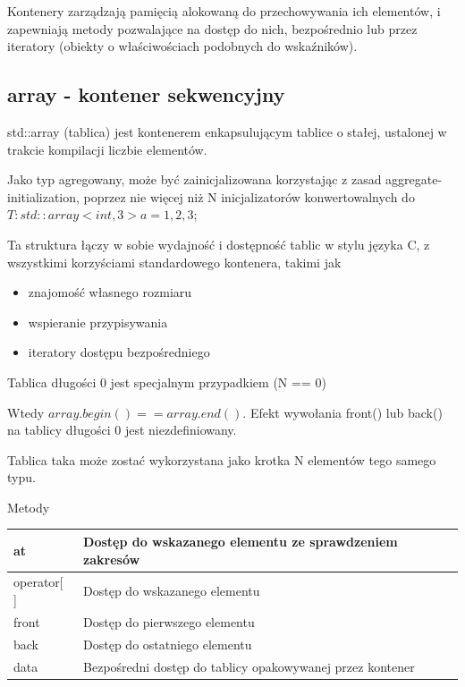 \documentclass[12pt]{article}
\begin{document}
    Kontenery zarządzają pamięcią alokowaną do przechowywania ich elementów, i zapewniają metody pozwalające na dostęp do nich, bezpośrednio lub przez iteratory (obiekty o właściwościach podobnych do wskaźników).

    \subsection{array - kontener sekwencyjny}
    std::array (tablica) jest kontenerem enkapsulującym tablice o stałej, ustalonej w trakcie kompilacji liczbie elementów.

    Jako typ agregowany, może być zainicjalizowana korzystając z zasad aggregate-initialization, poprzez nie więcej niż N inicjalizatorów konwertowalnych do \\ $T: std::array<int, 3> a = {1,2,3};$

    Ta struktura łączy w sobie wydajność i dostępność tablic w stylu języka C, z wszystkimi korzyściami standardowego kontenera, takimi jak
    \begin{itemize}
        \item znajomość własnego rozmiaru
        \item wspieranie przypisywania
        \item iteratory dostępu bezpośredniego
    \end{itemize}

    Tablica długości 0 jest specjalnym przypadkiem (N == 0)

    Wtedy $array.begin() == array.end()$. Efekt wywołania front() lub back() na tablicy długości 0 jest niezdefiniowany.

    Tablica taka może zostać wykorzystana jako krotka N elementów tego samego typu.

    Metody

    \begin{table}[H]
        \begin{tabular}{|l|l|}
            \hline
            at & Dostęp do wskazanego elementu ze sprawdzeniem zakresów    \\ \hline
            operator[ ] & Dostęp do wskazanego elementu                             \\ \hline
            front & Dostęp do pierwszego elementu                             \\ \hline
            back & Dostęp do ostatniego elementu                             \\ \hline
            data & Bezpośredni dostęp do tablicy opakowywanej przez kontener \\ \hline
        \end{tabular}
    \end{table}
\end{document}
